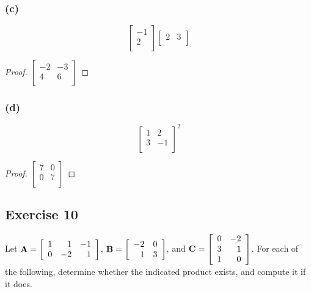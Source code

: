 \documentclass[14pt]{extarticle}
\begin{document}
\subsubsection{(c)}
\[
    \left[
        \begin{array}{r}
            -1 \\
            2  \\
        \end{array}
        \right]
    \left[
        \begin{array}{rr}
            2 & 3 \\
        \end{array}
        \right]
\]
\begin{proof}
    \(\left[
        \begin{array}{rr}
            -2 & -3 \\
            4  & 6  \\
        \end{array}
        \right]\)
\end{proof}

\subsubsection{(d)}
\[
    \left[
        \begin{array}{rr}
            1 & 2  \\
            3 & -1 \\
        \end{array}
        \right]^2
\]
\begin{proof}
    \(\left[
        \begin{array}{rr}
            7 & 0 \\
            0 & 7 \\
        \end{array}
        \right]\)
\end{proof}

\subsection{Exercise 10}
Let \({\bf A} =
\left[
    \begin{array}{rrr}
        1 & 1  & -1 \\
        0 & -2 & 1  \\
    \end{array}
    \right]
\), \({\bf B} =
\left[
    \begin{array}{rr}
        -2 & 0 \\
        1  & 3 \\
    \end{array}
    \right]
\), and \({\bf C} =
\left[
    \begin{array}{rr}
        0 & -2 \\
        3 & 1  \\
        1 & 0  \\
    \end{array}
    \right]
\). For each of the following, determine whether the indicated product exists, and compute it if it does.
\end{document}
